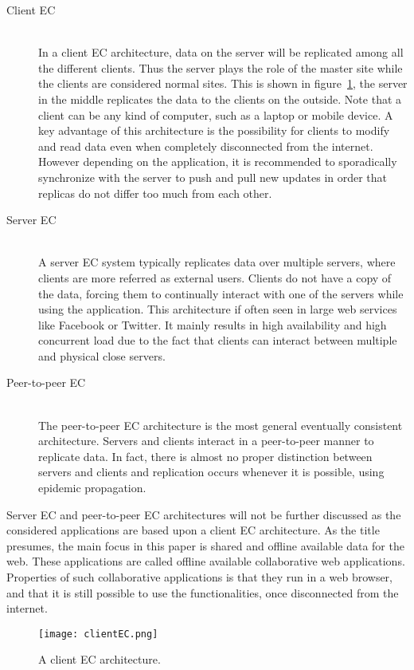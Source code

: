 \documentclass[a4paper,12pt]{report}
\begin{document}
\begin{description}
    \item[Client EC] \hfill \\ In a client EC architecture, data on the server will be replicated among all the different clients. Thus the server plays the role of the master site while the clients are considered normal sites. This is shown in figure~\ref{fig:clientEC}, the server in the middle replicates the data to the clients on the outside. Note that a client can be any kind of computer, such as a laptop or mobile device. A key advantage of this architecture is the possibility for clients to modify and read data even when completely disconnected from the internet. However depending on the application, it is recommended to sporadically synchronize with the server to push and pull new updates in order that replicas do not differ too much from each other. 
    \item[Server EC] \hfill \\ A server EC system typically replicates data over multiple servers, where clients are more referred as external users. Clients do not have a copy of the data, forcing them to continually interact with one of the servers while using the application. This architecture if often seen in large web services like Facebook or Twitter. It mainly results in high availability and high concurrent load due to the fact that clients can interact between multiple and physical close servers.
    \item[Peer-to-peer EC] \hfill \\ The peer-to-peer EC architecture is the most general eventually consistent architecture. Servers and clients interact in a peer-to-peer manner to replicate data. In fact, there is almost no proper distinction between servers and clients and replication occurs whenever it is possible, using epidemic propagation.
\end{description}

Server EC and peer-to-peer EC architectures will not be further discussed as the considered applications are based upon a client EC architecture. As the title presumes, the main focus in this paper is shared and offline available data for the web. These applications are called offline available collaborative web applications. Properties of such collaborative applications is that they run in a web browser, and that it is still possible to use the functionalities, once disconnected from the internet. 

\begin{figure}
    \vspace{-2,5cm}
    \small
    \centering
    \texttt{[image: clientEC.png]}
    \caption{A client EC architecture.}
    \label{fig:clientEC}
\end{figure}
\end{document}
